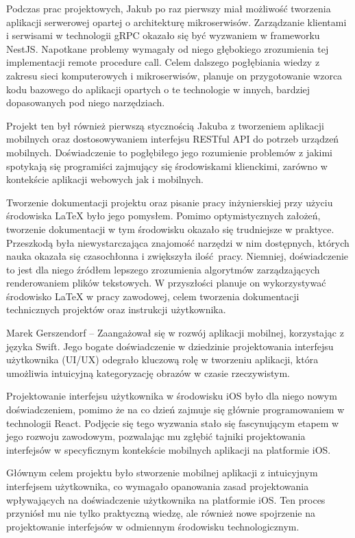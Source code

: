 \documentclass[12pt, a4paper, twoside, openany]{book}
\begin{document}
{Podczas prac projektowych, Jakub po raz pierwszy miał możliwość tworzenia aplikacji serwerowej opartej o architekturę mikroserwisów.
Zarządzanie klientami i serwisami w technologii gRPC okazało się być wyzwaniem w frameworku NestJS.
Napotkane problemy wymagały od niego głębokiego zrozumienia tej implementacji remote procedure call.
Celem dalszego pogłębiania wiedzy z zakresu sieci komputerowych i mikroserwisów, planuje on przygotowanie wzorca kodu bazowego do aplikacji opartych o te technologie w innych, bardziej dopasowanych pod niego narzędziach.

Projekt ten był również pierwszą stycznością Jakuba z tworzeniem aplikacji mobilnych oraz dostosowywaniem interfejsu RESTful API do potrzeb urządzeń mobilnych.
Doświadczenie to pogłębiłego jego rozumienie problemów z jakimi spotykają się programiści zajmujący się środowiskami klienckimi, zarówno w kontekście aplikacji webowych jak i mobilnych.

Tworzenie dokumentacji projektu oraz pisanie pracy inżynierskiej przy użyciu środowiska LaTeX było jego pomysłem. Pomimo optymistycznych założeń, tworzenie dokumentacji w tym środowisku okazało się trudniejsze w praktyce. Przeszkodą była niewystarczająca znajomość narzędzi w nim dostępnych, których nauka okazała się czasochłonna i zwiększyła ilość pracy.
Niemniej, doświadczenie to jest dla niego źródłem lepszego zrozumienia algorytmów zarządzających renderowaniem plików tekstowych.
W przyszłości planuje on wykorzystywać środowisko LaTeX w pracy zawodowej, celem tworzenia dokumentacji technicznych projektów oraz instrukcji użytkownika.

Marek Gerszendorf -- Zaangażował się w rozwój aplikacji mobilnej, korzystając z języka Swift. Jego bogate doświadczenie w dziedzinie projektowania interfejsu użytkownika (UI/UX) odegrało kluczową rolę w tworzeniu aplikacji, która umożliwia intuicyjną kategoryzację obrazów w czasie rzeczywistym.

Projektowanie interfejsu użytkownika w środowisku iOS było dla niego nowym doświadczeniem, pomimo że na co dzień zajmuje się głównie programowaniem w technologii React. Podjęcie się tego wyzwania stało się fascynującym etapem w jego rozwoju zawodowym, pozwalając mu zgłębić tajniki projektowania interfejsów w specyficznym kontekście mobilnych aplikacji na platformie iOS.

Głównym celem projektu było stworzenie mobilnej aplikacji z intuicyjnym interfejsem użytkownika, co wymagało opanowania zasad projektowania wpływających na doświadczenie użytkownika na platformie iOS. Ten proces przyniósł mu nie tylko praktyczną wiedzę, ale również nowe spojrzenie na projektowanie interfejsów w odmiennym środowisku technologicznym.

}
\end{document}
